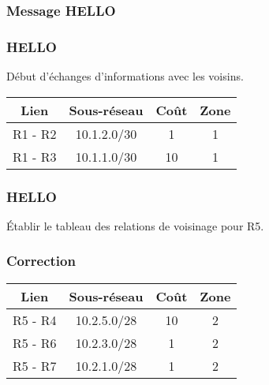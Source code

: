 \documentclass[svgnames,11pt]{beamer}
\begin{document}
\subsubsection{Message HELLO}
\begin{frame}
    \frametitle{HELLO}
    Début d'échanges d'informations avec les voisins.

    \begin{center}
        \begin{tabular}{|*{4}{c|}}
            \hline
            Lien    & Sous-réseau & Coût & Zone \\
            \hline
            R1 - R2 & 10.1.2.0/30 & 1    & 1    \\
            \hline
            R1 - R3 & 10.1.1.0/30 & 10   & 1    \\
            \hline
        \end{tabular}
    \end{center}
\end{frame}

\begin{frame}
    \frametitle{HELLO}

    \begin{activite}
        Établir le tableau des relations de voisinage pour R5.
    \end{activite}


\end{frame}

\begin{frame}
    \frametitle{Correction}

    \begin{center}
        \begin{tabular}{|*{4}{c|}}
            \hline
            Lien    & Sous-réseau & Coût & Zone \\
            \hline
            R5 - R4 & 10.2.5.0/28 & 10   & 2    \\
            \hline
            R5 - R6 & 10.2.3.0/28 & 1    & 2    \\
            \hline
            R5 - R7 & 10.2.1.0/28 & 1    & 2    \\
            \hline
        \end{tabular}
    \end{center}

\end{frame}
\end{document}
